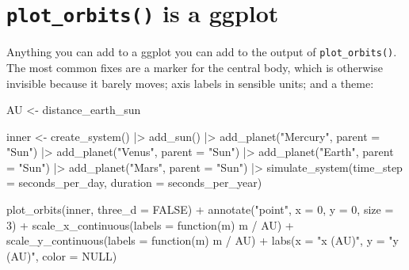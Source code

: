 \documentclass[
  10.5pt,
  letterpaper,
]{scrbook}
\newenvironment{Shaded}{\begin{snugshade}}{\end{snugshade}}
\newcommand{\AttributeTok}[1]{\textcolor[rgb]{0.00,0.00,0.00}{#1}}
\newcommand{\ConstantTok}[1]{\textcolor[rgb]{0.00,0.00,0.00}{#1}}
\newcommand{\ControlFlowTok}[1]{\textcolor[rgb]{0.00,0.00,0.00}{#1}}
\newcommand{\DecValTok}[1]{\textcolor[rgb]{0.00,0.00,0.00}{#1}}
\newcommand{\FunctionTok}[1]{\textcolor[rgb]{0.00,0.00,0.00}{#1}}
\newcommand{\NormalTok}[1]{\textcolor[rgb]{0.00,0.00,0.00}{#1}}
\newcommand{\OtherTok}[1]{\textcolor[rgb]{0.00,0.00,0.00}{#1}}
\newcommand{\SpecialCharTok}[1]{\textcolor[rgb]{0.00,0.00,0.00}{#1}}
\newcommand{\StringTok}[1]{\textcolor[rgb]{0.00,0.00,0.00}{#1}}
\theoremstyle{definition}
\theoremstyle{plain}
\theoremstyle{remark}
\begin{document}
\section{\texorpdfstring{\texttt{plot\_orbits()} is a
ggplot}{plot\_orbits() is a ggplot}}\label{plot_orbits-is-a-ggplot}

Anything you can add to a ggplot you can add to the output of
\texttt{plot\_orbits()}. The most common fixes are a marker for the
central body, which is otherwise invisible because it barely moves; axis
labels in sensible units; and a theme:

\begin{Shaded}
\begin{Highlighting}[]
\NormalTok{AU }\OtherTok{\textless{}{-}}\NormalTok{ distance\_earth\_sun}

\NormalTok{inner }\OtherTok{\textless{}{-}} \FunctionTok{create\_system}\NormalTok{() }\SpecialCharTok{|\textgreater{}}
  \FunctionTok{add\_sun}\NormalTok{() }\SpecialCharTok{|\textgreater{}}
  \FunctionTok{add\_planet}\NormalTok{(}\StringTok{"Mercury"}\NormalTok{, }\AttributeTok{parent =} \StringTok{"Sun"}\NormalTok{) }\SpecialCharTok{|\textgreater{}}
  \FunctionTok{add\_planet}\NormalTok{(}\StringTok{"Venus"}\NormalTok{,   }\AttributeTok{parent =} \StringTok{"Sun"}\NormalTok{) }\SpecialCharTok{|\textgreater{}}
  \FunctionTok{add\_planet}\NormalTok{(}\StringTok{"Earth"}\NormalTok{,   }\AttributeTok{parent =} \StringTok{"Sun"}\NormalTok{) }\SpecialCharTok{|\textgreater{}}
  \FunctionTok{add\_planet}\NormalTok{(}\StringTok{"Mars"}\NormalTok{,    }\AttributeTok{parent =} \StringTok{"Sun"}\NormalTok{) }\SpecialCharTok{|\textgreater{}}
  \FunctionTok{simulate\_system}\NormalTok{(}\AttributeTok{time\_step =}\NormalTok{ seconds\_per\_day, }\AttributeTok{duration =}\NormalTok{ seconds\_per\_year)}

\FunctionTok{plot\_orbits}\NormalTok{(inner, }\AttributeTok{three\_d =} \ConstantTok{FALSE}\NormalTok{) }\SpecialCharTok{+}
  \FunctionTok{annotate}\NormalTok{(}\StringTok{"point"}\NormalTok{, }\AttributeTok{x =} \DecValTok{0}\NormalTok{, }\AttributeTok{y =} \DecValTok{0}\NormalTok{, }\AttributeTok{size =} \DecValTok{3}\NormalTok{) }\SpecialCharTok{+}
  \FunctionTok{scale\_x\_continuous}\NormalTok{(}\AttributeTok{labels =} \ControlFlowTok{function}\NormalTok{(m) m }\SpecialCharTok{/}\NormalTok{ AU) }\SpecialCharTok{+}
  \FunctionTok{scale\_y\_continuous}\NormalTok{(}\AttributeTok{labels =} \ControlFlowTok{function}\NormalTok{(m) m }\SpecialCharTok{/}\NormalTok{ AU) }\SpecialCharTok{+}
  \FunctionTok{labs}\NormalTok{(}\AttributeTok{x =} \StringTok{"x (AU)"}\NormalTok{, }\AttributeTok{y =} \StringTok{"y (AU)"}\NormalTok{, }\AttributeTok{color =} \ConstantTok{NULL}\NormalTok{)}
\end{Highlighting}
\end{Shaded}
\end{document}
